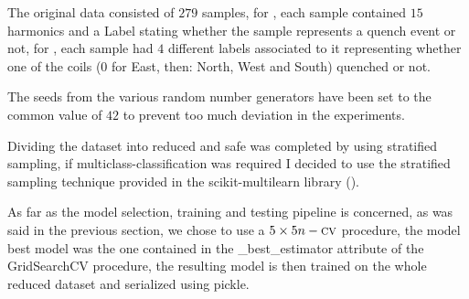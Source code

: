 The original data consisted of $279$ samples, for \qrp, each sample contained $15$ harmonics and a Label
stating whether the sample represents a quench event or not, for \qlp, each sample had $4$ different
labels associated to it representing whether one of the coils ($0$ for East, then: North, West and
South) quenched or not.

The seeds from the various random number generators have been set to the common value of $42$ to
prevent too much deviation in the experiments.

Dividing the dataset into reduced and safe was completed by using stratified sampling, if
multiclass-classification was required I decided to use the stratified sampling technique provided
in the scikit-multilearn library (\cite{skmlearn}).

As far as the model selection, training and testing pipeline is concerned, as was said in the
previous section, we chose to use a $5\times5 n-\textsc{cv}$ procedure, the model best model was the one
contained in the \_best\_estimator attribute of the GridSearchCV procedure, the resulting
model is then trained on the whole reduced dataset and serialized using pickle.

